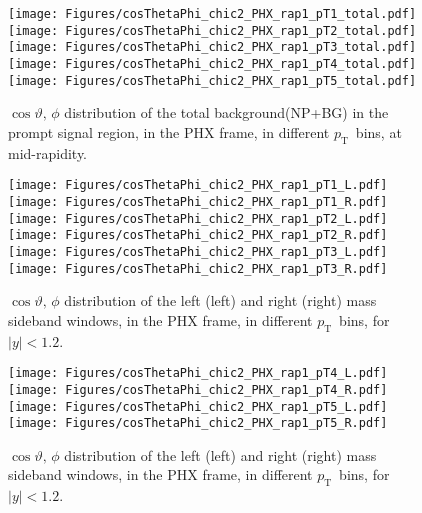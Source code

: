 \documentclass[12pt]{article}
\newcommand{\pt}{$p_{\mathrm{T}}$}
\begin{document}


\begin{figure}[htbp]
\centering
\texttt{[image: Figures/cosThetaPhi\_chic2\_PHX\_rap1\_pT1\_total.pdf]}
\texttt{[image: Figures/cosThetaPhi\_chic2\_PHX\_rap1\_pT2\_total.pdf]}
\texttt{[image: Figures/cosThetaPhi\_chic2\_PHX\_rap1\_pT3\_total.pdf]}
\texttt{[image: Figures/cosThetaPhi\_chic2\_PHX\_rap1\_pT4\_total.pdf]}
\texttt{[image: Figures/cosThetaPhi\_chic2\_PHX\_rap1\_pT5\_total.pdf]}
\caption{$\cos\vartheta,\,\phi$ distribution of the total
  background(NP+BG) in the prompt signal region,
        in the PHX frame, in different \pt\ bins, at mid-rapidity.}
\end{figure}
\clearpage


\begin{figure}[htbp]
\centering
\texttt{[image: Figures/cosThetaPhi\_chic2\_PHX\_rap1\_pT1\_L.pdf]}
\texttt{[image: Figures/cosThetaPhi\_chic2\_PHX\_rap1\_pT1\_R.pdf]}
\texttt{[image: Figures/cosThetaPhi\_chic2\_PHX\_rap1\_pT2\_L.pdf]}
\texttt{[image: Figures/cosThetaPhi\_chic2\_PHX\_rap1\_pT2\_R.pdf]}
\texttt{[image: Figures/cosThetaPhi\_chic2\_PHX\_rap1\_pT3\_L.pdf]}
\texttt{[image: Figures/cosThetaPhi\_chic2\_PHX\_rap1\_pT3\_R.pdf]}
\caption{$\cos\vartheta,\,\phi$ distribution of the left (left) and
  right (right) mass sideband windows, in the PHX frame, in different
  \pt\ bins, for $|y| < 1.2$.}
\end{figure}
\clearpage

\begin{figure}[htbp]
\centering
\texttt{[image: Figures/cosThetaPhi\_chic2\_PHX\_rap1\_pT4\_L.pdf]}
\texttt{[image: Figures/cosThetaPhi\_chic2\_PHX\_rap1\_pT4\_R.pdf]}
\texttt{[image: Figures/cosThetaPhi\_chic2\_PHX\_rap1\_pT5\_L.pdf]}
\texttt{[image: Figures/cosThetaPhi\_chic2\_PHX\_rap1\_pT5\_R.pdf]}
\caption{$\cos\vartheta,\,\phi$ distribution of the left (left) and
  right (right) mass sideband windows, in the PHX frame, in different
  \pt\ bins, for $|y| < 1.2$.}
\end{figure}
\clearpage
\end{document}
